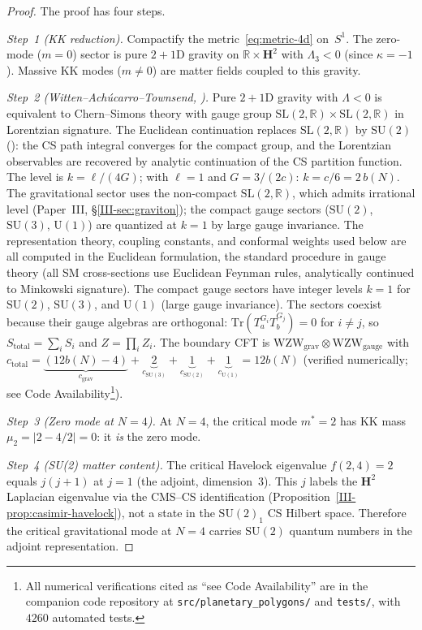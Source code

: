 \begin{proof}
The proof has four steps.

\emph{Step~1 (KK reduction).}
Compactify the metric~\eqref{eq:metric-4d} on~$S^1$.
The zero-mode ($m = 0$) sector is pure $2{+}1$D gravity on
$\mathbb{R} \times \mathbf{H}^2$ with $\Lambda_3 < 0$ (since $\kappa = -1$).
Massive KK modes ($m \ne 0$) are matter fields coupled to this gravity.

\emph{Step~2 (Witten--Ach\'ucarro--Townsend, \citeyear{Witten1988}).}
Pure $2{+}1$D gravity with $\Lambda < 0$ is equivalent to
Chern--Simons theory with gauge group
$\mathrm{SL}(2,\mathbb{R}) \times \mathrm{SL}(2,\mathbb{R})$
in Lorentzian signature.
The Euclidean continuation replaces
$\mathrm{SL}(2,\mathbb{R})$ by $\mathrm{SU}(2)$
(\citealt{Witten1988}): the CS path integral
converges for the compact group, and the Lorentzian
observables are recovered by analytic continuation of
the CS partition function.
The level is $k = \ell/(4G)$;
with $\ell = 1$ and $G = 3/(2c)$: $k = c/6 = 2\,b(N)$.
The gravitational sector uses the non-compact
$\mathrm{SL}(2,\mathbb{R})$, which admits irrational level
(Paper~III, \S\ref*{III-sec:graviton});
the compact gauge sectors ($\mathrm{SU}(2)$,
$\mathrm{SU}(3)$, $\mathrm{U}(1)$) are quantized
at $k = 1$ by large gauge invariance.
The representation theory, coupling constants, and
conformal weights used below are all computed in the
Euclidean formulation, the standard procedure in
gauge theory (all SM cross-sections use Euclidean
Feynman rules, analytically continued to
Minkowski signature).
The compact gauge sectors have integer levels
$k = 1$ for $\mathrm{SU}(2)$, $\mathrm{SU}(3)$, and
$\mathrm{U}(1)$ (large gauge invariance).
The sectors coexist because their gauge algebras are orthogonal:
$\mathrm{Tr}(T_a^{G_i} T_b^{G_j}) = 0$ for $i \ne j$, so
$S_{\mathrm{total}} = \sum_i S_i$ and $Z = \prod_i Z_i$.
The boundary CFT is
$\mathrm{WZW}_{\mathrm{grav}} \otimes \mathrm{WZW}_{\mathrm{gauge}}$
with $c_{\mathrm{total}} = \underbrace{(12b(N){-}4)}_{c_{\mathrm{grav}}}
+ \underbrace{2}_{c_{\mathrm{SU}(3)}}
+ \underbrace{1}_{c_{\mathrm{SU}(2)}}
+ \underbrace{1}_{c_{\mathrm{U}(1)}} = 12b(N)$
(verified numerically; see Code Availability\footnote{All
numerical verifications cited as ``see Code Availability''
are in the companion code repository at
\texttt{src/planetary\_polygons/} and \texttt{tests/},
with $4260$ automated tests.}).

\emph{Step~3 (Zero mode at $N = 4$).}
At $N = 4$, the critical mode $m^* = 2$ has KK mass
$\mu_2 = |2 - 4/2| = 0$: it \emph{is} the zero mode.

\emph{Step~4 (SU(2) matter content).}
The critical Havelock eigenvalue $f(2,4) = 2$ equals
$j(j{+}1)$ at $j = 1$ (the adjoint, dimension~$3$).
This $j$ labels the $\mathbf{H}^2$ Laplacian eigenvalue
via the CMS--CS identification
(Proposition~\ref{III-prop:casimir-havelock}),
not a state in the $\mathrm{SU}(2)_1$ CS Hilbert space.
Therefore the critical gravitational mode at $N = 4$ carries
$\mathrm{SU}(2)$ quantum numbers in the adjoint representation.
\end{proof}

